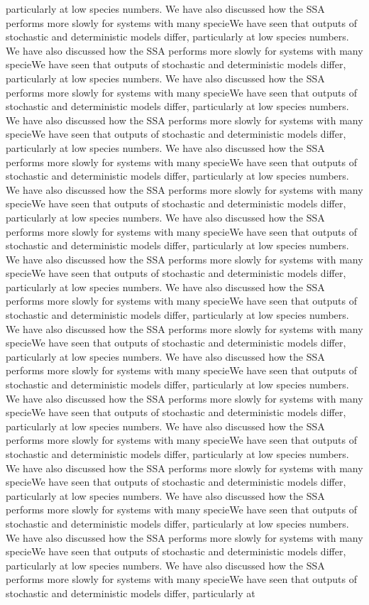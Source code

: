 \documentclass[11pt]{article}
\begin{document}
\begin{multicols}{2}
particularly at low species numbers. We have also discussed how the SSA performs more slowly for systems with many specieWe have seen that outputs of stochastic and deterministic models differ, particularly at low species numbers. We have also discussed how the SSA performs more slowly for systems with many specieWe have seen that outputs of stochastic and deterministic models differ, particularly at low species numbers. We have also discussed how the SSA performs more slowly for systems with many specieWe have seen that outputs of stochastic and deterministic models differ, particularly at low species numbers. We have also discussed how the SSA performs more slowly for systems with many specieWe have seen that outputs of stochastic and deterministic models differ, particularly at low species numbers. We have also discussed how the SSA performs more slowly for systems with many specieWe have seen that outputs of stochastic and deterministic models differ, particularly at low species numbers. We have also discussed how the SSA performs more slowly for systems with many specieWe have seen that outputs of stochastic and deterministic models differ, particularly at low species numbers. We have also discussed how the SSA performs more slowly for systems with many specieWe have seen that outputs of stochastic and deterministic models differ, particularly at low species numbers. We have also discussed how the SSA performs more slowly for systems with many specieWe have seen that outputs of stochastic and deterministic models differ, particularly at low species numbers. We have also discussed how the SSA performs more slowly for systems with many specieWe have seen that outputs of stochastic and deterministic models differ, particularly at low species numbers. We have also discussed how the SSA performs more slowly for systems with many specieWe have seen that outputs of stochastic and deterministic models differ, particularly at low species numbers. We have also discussed how the SSA performs more slowly for systems with many specieWe have seen that outputs of stochastic and deterministic models differ, particularly at low species numbers. We have also discussed how the SSA performs more slowly for systems with many specieWe have seen that outputs of stochastic and deterministic models differ, particularly at low species numbers. We have also discussed how the SSA performs more slowly for systems with many specieWe have seen that outputs of stochastic and deterministic models differ, particularly at low species numbers. We have also discussed how the SSA performs more slowly for systems with many specieWe have seen that outputs of stochastic and deterministic models differ, particularly at low species numbers. We have also discussed how the SSA performs more slowly for systems with many specieWe have seen that outputs of stochastic and deterministic models differ, particularly at low species numbers. We have also discussed how the SSA performs more slowly for systems with many specieWe have seen that outputs of stochastic and deterministic models differ, particularly at low species numbers. We have also discussed how the SSA performs more slowly for systems with many specieWe have seen that outputs of stochastic and deterministic models differ, particularly at 
\end{multicols}
\end{document}
